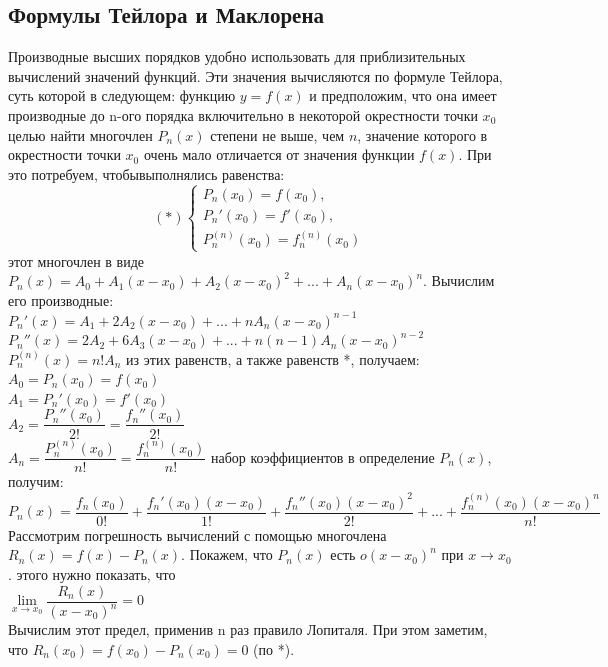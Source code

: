 \documentclass[oneside]{book}
\begin{document}
\begin{itemize}
\begin{enumerate}
\chapter{Формулы Тейлора и Маклорена}
Производные высших порядков удобно использовать для приблизительных вычислений значений функций. Эти значения вычисляются по формуле Тейлора, суть которой в следующем: 
 функцию $y=f(x)$ и предположим, что она имеет производные до n-ого порядка включительно в некоторой окрестности точки $x_0$
 целью найти многочлен $P_n(x)$ степени не выше, чем $n$, значение которого в окрестности точки $x_0$ очень мало отличается от значения функции $f(x)$. При это потребуем, чтобывыполнялись равенства:
\begin{equation}
(*)
	\begin{cases}
	P_n(x_0)=f(x_0),\\
	P_n'(x_0)=f'(x_0),\\
	P_n^{(n)}(x_0)=f_n^{(n)}(x_0)
	\end{cases}
\end{equation}
 этот многочлен в виде $P_n(x)=A_0+A_1(x-x_0)+A_2(x-x_0)^2+...+A_n(x-x_0)^n$. Вычислим его производные:\\
$P_n'(x)=A_1+2A_2(x-x_0)+...+nA_n(x-x_0)^{n-1}$\\
$P_n''(x)=2A_2+6A_3(x-x_0)+...+n(n-1)A_n(x-x_0)^{n-2}$\\
$P_n^{(n)}(x)=n!A_n$
 из этих равенств, а также равенств *, получаем:\\
$A_0=P_n(x_0)=f(x_0)$\\
$A_1=P_n'(x_0)=f'(x_0)$\\
$A_2=\dfrac{P_n''(x_0)}{2!}=\dfrac{f_n''(x_0)}{2!}$
\\$A_n=\dfrac{P_n^{(n)}(x_0)}{n!}=\dfrac{f_n^{(n)}(x_0)}{n!}$
 набор коэффициентов в определение $P_n(x)$, получим:
\\$P_n(x)=\dfrac{f_n(x_0)}{0!}+\dfrac{f_n'(x_0)(x-x_0)}{1!}+\dfrac{f_n''(x_0)(x-x_0)^2}{2!}+...+\dfrac{f_n^{(n)}(x_0)(x-x_0)^n}{n!}$\\
Рассмотрим погрешность вычислений с помощью многочлена $R_n(x)=f(x)-P_n(x)$. Покажем, что $P_n(x)$ есть $o(x-x_0)^n$ при $x \rightarrow x_0$.
 этого нужно показать, что\\
$\lim \limits_{x \rightarrow x_0}\dfrac{R_n(x)}{(x-x_0)^n}=0$\\
Вычислим этот предел, применив n раз правило Лопиталя. При этом заметим, что $R_n(x_0)=f(x_0)-P_n(x_0)=0$ (по *).\\

\end{enumerate}
\end{itemize}
\end{document}
